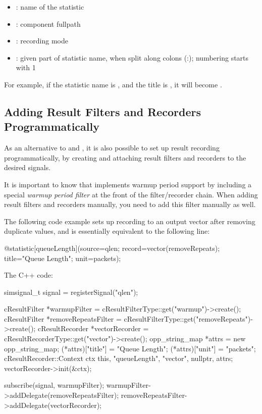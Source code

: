 \begin{itemize}
  \item {}: name of the statistic
  \item {}: component fullpath
  \item {}: recording mode
  \item {}: given part of statistic name, when split
    along colons (:); numbering starts with 1
\end{itemize}

For example, if the statistic name is ,
and the title is , it will become
.


\subsection{Adding Result Filters and Recorders Programmatically}
\label{sec:simple-modules:statistic-recording-programmatically}

As an alternative to  and ,
it is also possible to set up result recording programmatically, by creating and
attaching result filters and recorders to the desired signals.

\begin{note}
It is important to know that  implements warmup period
support by including a special \textit{warmup period filter} at the
front of the filter/recorder chain. When adding result filters and recorders
manually, you need to add this filter manually as well.
\end{note}

The following code example sets up recording to an output vector after
removing duplicate values, and is essentially equivalent to the following
 line:

\begin{ned}
@statistic[queueLength](source=qlen; record=vector(removeRepeats);
                        title="Queue Length"; unit=packets);
\end{ned}

The C++ code:

\begin{cpp}
simsignal_t signal = registerSignal("qlen");

cResultFilter *warmupFilter =
        cResultFilterType::get("warmup")->create();
cResultFilter *removeRepeatsFilter =
        cResultFilterType::get("removeRepeats")->create();
cResultRecorder *vectorRecorder =
        cResultRecorderType::get("vector")->create();
opp_string_map *attrs = new opp_string_map;
(*attrs)["title"] = "Queue Length";
(*attrs)["unit"] = "packets";
cResultRecorder::Context ctx { this, "queueLength", "vector",
                               nullptr, attrs};
vectorRecorder->init(&ctx);

subscribe(signal, warmupFilter);
warmupFilter->addDelegate(removeRepeatsFilter);
removeRepeatsFilter->addDelegate(vectorRecorder);
\end{cpp}


